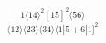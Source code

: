 \documentclass[varwidth, border=5pt]{standalone}
\begin{document}
\begin{my}
$\begin{gathered}
\scriptscriptstyle\frac{1⟨14⟩^2[15]^2⟨56⟩}{⟨12⟩⟨23⟩⟨34⟩⟨1|5+6|1]^2}
\end{gathered}$
\end{my}
\end{document}
